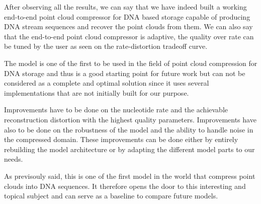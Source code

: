 
After observing all the results, we can say that we have indeed built a working end-to-end point cloud compressor for DNA based storage capable of producing DNA stream sequences and recover the point clouds from them. 
We can also say that the end-to-end point cloud compressor is adaptive, the quality over rate can be tuned by the user as seen on the rate-distortion tradeoff curve. 

The model is one of the first to be used in the field of point cloud compression for DNA storage and thus is a good starting point for future work but can not be considered as a complete and optimal solution since it uses several implementations that are not initially built for our purpose.  

Improvements have to be done on the nucleotide rate and the achievable reconstruction distortion with the highest quality parameters. 
Improvements have also to be done on the robustness of the model and the ability to handle noise in the compressed domain.
These improvements can be done either by entirely rebuilding the model architecture or by adapting the different model parts to our needs.

As previsouly said, this is one of the first model in the world that compress point clouds into DNA sequences.
It therefore opens the door to this interesting and topical subject and can serve as a baseline to compare future models.

